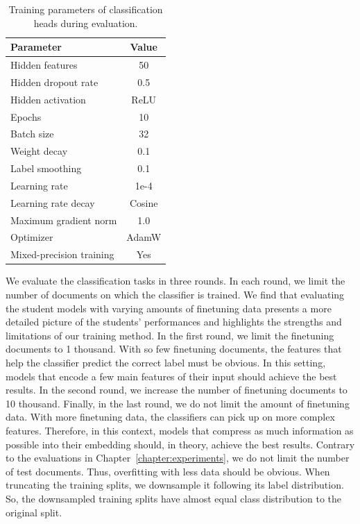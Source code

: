 \begin{table}
  \footnotesize
  \centering

  \begin{tabular}{l c}
    \toprule
    Parameter & Value \\
    \midrule
    Hidden features & 50 \\
    Hidden dropout rate & 0.5 \\
    Hidden activation & ReLU \\
    Epochs & 10 \\
    Batch size & 32 \\
    Weight decay & 0.1 \\
    Label smoothing & 0.1 \\
    Learning rate & 1e-4 \\
    Learning rate decay & Cosine \\
    Maximum gradient norm & 1.0 \\
    Optimizer & AdamW \\
    Mixed-precision training & Yes \\
    \bottomrule
  \end{tabular}

  \caption{Training parameters of classification heads during evaluation.}

  \label{table:head_train_eval_params}

\end{table}

We evaluate the classification tasks in three rounds. In each round, we limit
the number of documents on which the classifier is trained. We find that
evaluating the student models with varying amounts of finetuning data presents
a more detailed picture of the students' performances and highlights the
strengths and limitations of our training method. In the first round, we limit
the finetuning documents to 1 thousand. With so few finetuning documents, the
features that help the classifier predict the correct label must be obvious. In
this setting, models that encode a few main features of their input should
achieve the best results. In the second round, we increase the number of
finetuning documents to 10 thousand. Finally, in the last round, we do not
limit the amount of finetuning data. With more finetuning data, the classifiers
can pick up on more complex features. Therefore, in this context, models that
compress as much information as possible into their embedding should, in
theory, achieve the best results. Contrary to the evaluations in
Chapter~\ref{chapter:experiments}, we do not limit the number of test
documents. Thus, overfitting with less data should be obvious. When truncating
the training splits, we downsample it following its label distribution. So, the
downsampled training splits have almost equal class distribution to the
original split.

